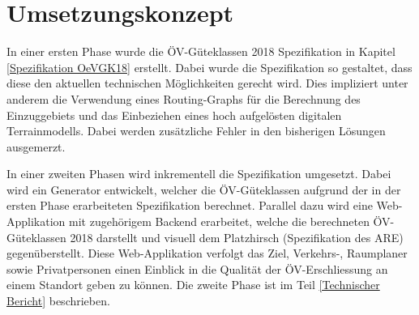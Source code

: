 
\section{Umsetzungskonzept}
\label{Umsetzungskonzept}

In einer ersten Phase wurde die \gls{ÖV-Güteklassen} 2018 Spezifikation in Kapitel \ref{Spezifikation OeVGK18} erstellt.
Dabei wurde die Spezifikation so gestaltet, dass diese den aktuellen technischen Möglichkeiten gerecht wird.
Dies impliziert unter anderem die Verwendung eines \glspl{Routing-Graph} für die Berechnung des Einzuggebiets und das Einbeziehen eines hoch aufgelösten digitalen \gls{Terrainmodell}s.
Dabei werden zusätzliche Fehler in den bisherigen Lösungen ausgemerzt.

In einer zweiten Phasen wird inkrementell die Spezifikation umgesetzt.
Dabei wird ein Generator entwickelt, welcher die \gls{ÖV-Güteklassen} aufgrund der in der ersten Phase erarbeiteten Spezifikation berechnet.
Parallel dazu wird eine Web-Applikation mit zugehörigem Backend erarbeitet, welche die berechneten \gls{ÖV-Güteklassen} 2018 darstellt und visuell dem Platzhirsch (Spezifikation des \acl{ARE}) gegenüberstellt.
Diese Web-Applikation verfolgt das Ziel, Verkehrs-, Raumplaner sowie Privatpersonen einen Einblick in die Qualität der ÖV-Erschliessung an einem Standort geben zu können.
Die zweite Phase ist im Teil \ref{Technischer Bericht} beschrieben.
